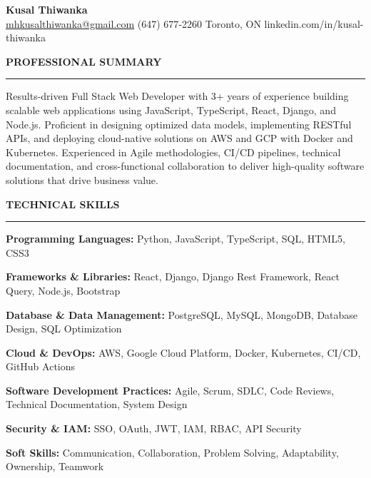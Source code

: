 \documentclass[10pt,letterpaper]{article}
\begin{document}
\begin{center}
{\LARGE\textbf{Kusal Thiwanka}}\\[3pt]
\href{mailto:mhkusalthiwanka@gmail.com}{mhkusalthiwanka@gmail.com}\hspace{2em}%
(647) 677{-}2260\hspace{2em}%
Toronto, ON\hspace{2em}
linkedin.com/in/kusal-thiwanka
\end{center}

\vspace{6pt}

\textbf{PROFESSIONAL SUMMARY}\\[-8pt]
\noindent\rule{\textwidth}{1pt}

\vspace{-2pt}

Results-driven Full Stack Web Developer with 3+ years of experience building scalable web applications using JavaScript, TypeScript, React, Django, and Node.js. Proficient in designing optimized data models, implementing RESTful APIs, and deploying cloud-native solutions on AWS and GCP with Docker and Kubernetes. Experienced in Agile methodologies, CI/CD pipelines, technical documentation, and cross-functional collaboration to deliver high-quality software solutions that drive business value.

\vspace{8pt}

\textbf{TECHNICAL SKILLS}\\[-8pt]
\noindent\rule{\textwidth}{1pt}

\vspace{-2pt}

\textbf{Programming Languages:} Python, JavaScript, TypeScript, SQL, HTML5, CSS3

\textbf{Frameworks \& Libraries:} React, Django, Django Rest Framework, React Query, Node.js, Bootstrap

\textbf{Database \& Data Management:} PostgreSQL, MySQL, MongoDB, Database Design, SQL Optimization

\textbf{Cloud \& DevOps:} AWS, Google Cloud Platform, Docker, Kubernetes, CI/CD, GitHub Actions

\textbf{Software Development Practices:} Agile, Scrum, SDLC, Code Reviews, Technical Documentation, System Design

\textbf{Security \& IAM:} SSO, OAuth, JWT, IAM, RBAC, API Security

\textbf{Soft Skills:} Communication, Collaboration, Problem Solving, Adaptability, Ownership, Teamwork
\end{document}
